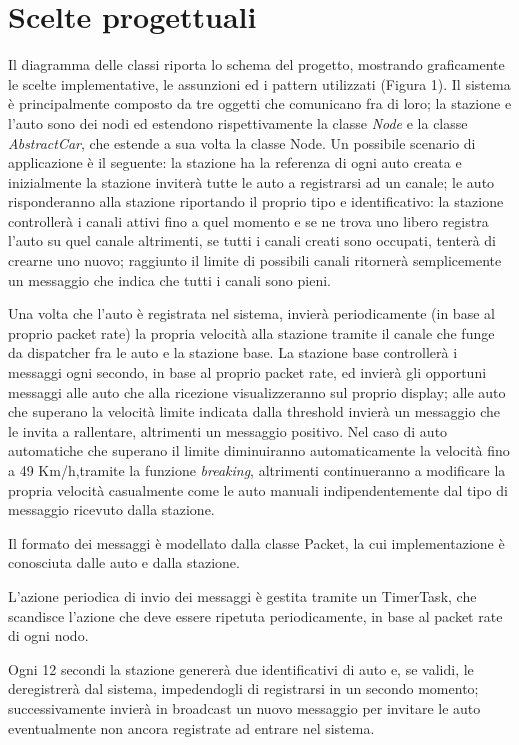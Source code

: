 \documentclass[a4paper,10pt]{article}
\begin{document}
\section{Scelte progettuali}
Il diagramma delle classi riporta lo schema del progetto, mostrando graficamente le scelte implementative, le assunzioni ed i pattern utilizzati (Figura 1). Il sistema è principalmente composto da tre oggetti che comunicano fra di loro; la stazione e l'auto sono dei nodi ed estendono rispettivamente la classe \textit{Node} e la classe \textit{AbstractCar}, che estende a sua volta la classe Node. Un possibile scenario di applicazione è il seguente: la stazione ha la referenza di ogni auto creata e inizialmente la stazione inviterà tutte le auto a registrarsi ad un canale; le auto risponderanno alla stazione riportando il proprio tipo e identificativo: la stazione controllerà i canali attivi fino a quel momento e se ne trova uno libero registra l'auto su quel canale altrimenti, se tutti i canali creati sono occupati, tenterà di crearne uno nuovo; raggiunto il limite di possibili canali ritornerà semplicemente un messaggio che indica che tutti i canali sono pieni.

Una volta che l'auto è registrata nel sistema, invierà periodicamente (in base al proprio packet rate) la propria velocità alla stazione tramite il canale che funge da dispatcher fra le auto e la stazione base. La stazione base controllerà i messaggi ogni secondo, in base al proprio packet rate, ed invierà gli opportuni messaggi alle auto che alla ricezione visualizzeranno sul proprio display; alle auto che superano la velocità limite indicata dalla threshold invierà un messaggio che le invita a rallentare, altrimenti un messaggio positivo. Nel caso di auto automatiche che superano il limite  diminuiranno automaticamente la velocità fino a 49 Km/h,tramite la funzione \textit{breaking},  altrimenti continueranno a modificare la propria velocità casualmente come le auto manuali indipendentemente dal tipo di messaggio ricevuto dalla stazione.

Il formato dei messaggi è modellato dalla classe Packet, la cui implementazione è conosciuta dalle auto e dalla stazione.

L'azione periodica di invio dei messaggi è gestita tramite un TimerTask, che scandisce l'azione che deve essere ripetuta periodicamente, in base al packet rate di ogni nodo.

Ogni 12 secondi la stazione genererà due identificativi di auto e, se validi, le deregistrerà dal sistema, impedendogli di registrarsi in un secondo momento; successivamente invierà in broadcast un nuovo messaggio per invitare le auto eventualmente non ancora registrate ad entrare nel sistema.
\end{document}
